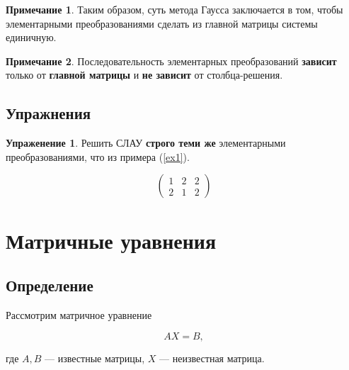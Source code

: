 \documentclass[]{article}
\theoremstyle{theorem}
\theoremstyle{definition}
\newtheorem{tk}{Упраженение}
\newtheorem*{nt}{Примечание}
\begin{document}
\begin{nt}
	Таким образом, суть метода Гаусса заключается в том, чтобы элементарными преобразованиями сделать из главной матрицы системы единичную.
\end{nt}

\begin{nt}
	Последовательность элементарных преобразований \textbf{зависит} только от \textbf{главной матрицы} и \textbf{не зависит} от столбца-решения.
\end{nt}

\subsection{Упражнения}
\begin{tk}
	Решить СЛАУ \textbf{строго теми же} элементарными преобразованиями, что из примера (\ref{ex1}).
\end{tk}
\begin{equation*}
		\left(
	\begin{array}{ll|l}
		1 & 2 & 2
		\\
		2 & 1 & 2
	\end{array}
	\right)
\end{equation*}

\section{Матричные уравнения}
\subsection{Определение}
Рассмотрим матричное уравнение 

\begin{equation}
	AX=B,
\end{equation}

где $A,B$ --- известные матрицы, $X$ --- неизвестная матрица.
\end{document}
